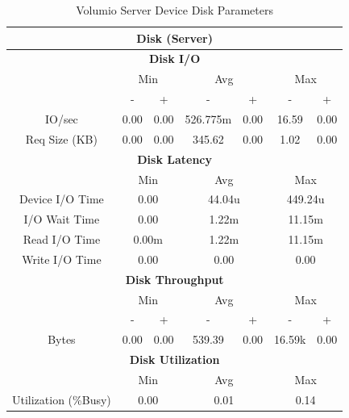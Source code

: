 \documentclass[11pt,a4paper]{scrreprt}
\begin{document}
\begin{table}[H]
\centering
    \begin{tabular}{||c|c|c|c|c|c|c||}
    \hline
    \multicolumn{7}{|c|}{\textbf{Disk (Server)}} \\
    \hline
    \multicolumn{7}{|c|}{\textbf{Disk I/O}} \\
    \hline\hline
      & \multicolumn{2}{|c|}{Min} & \multicolumn{2}{|c|}{Avg} & \multicolumn{2}{|c|}{Max} \\
    \hline
      & - & + & - & + & - & + \\
    \hline
    IO/sec & 0.00 & 0.00 & 526.775m & 0.00 & 16.59 & 0.00 \\
    \hline
    Req Size (KB) & 0.00 & 0.00 & 345.62 & 0.00 & 1.02 & 0.00 \\
    \hline\hline
    \multicolumn{7}{|c|}{\textbf{Disk Latency}} \\
    \hline\hline
      & \multicolumn{2}{|c|}{Min} & \multicolumn{2}{|c|}{Avg} & \multicolumn{2}{|c|}{Max} \\
    \hline
    Device I/O Time  & \multicolumn{2}{|c|}{0.00} & \multicolumn{2}{|c|}{44.04u} & \multicolumn{2}{|c|}{449.24u} \\
    \hline
    I/O Wait Time  & \multicolumn{2}{|c|}{0.00} & \multicolumn{2}{|c|}{1.22m} & \multicolumn{2}{|c|}{11.15m} \\
    \hline
    Read I/O Time  & \multicolumn{2}{|c|}{0.00m} & \multicolumn{2}{|c|}{1.22m} & \multicolumn{2}{|c|}{11.15m} \\
    \hline
    Write I/O Time  & \multicolumn{2}{|c|}{0.00} & \multicolumn{2}{|c|}{0.00} & \multicolumn{2}{|c|}{0.00} \\
    \hline\hline
    \multicolumn{7}{|c|}{\textbf{Disk Throughput}} \\
    \hline\hline
      & \multicolumn{2}{|c|}{Min} & \multicolumn{2}{|c|}{Avg} & \multicolumn{2}{|c|}{Max} \\
    \hline
      & - & + & - & + & - & + \\
    \hline
    Bytes & 0.00 & 0.00 & 539.39 & 0.00 & 16.59k & 0.00 \\
    \hline\hline
    \multicolumn{7}{|c|}{\textbf{Disk Utilization}} \\
    \hline\hline
      & \multicolumn{2}{|c|}{Min} & \multicolumn{2}{|c|}{Avg} & \multicolumn{2}{|c|}{Max} \\
    \hline
    Utilization (\%Busy)  & \multicolumn{2}{|c|}{0.00} & \multicolumn{2}{|c|}{0.01} & \multicolumn{2}{|c|}{0.14} \\
    \hline\hline
    \end{tabular}
    \caption{Volumio Server Device Disk Parameters}
    \label{VolumioserverDiskTab}
\end{table}
\end{document}
